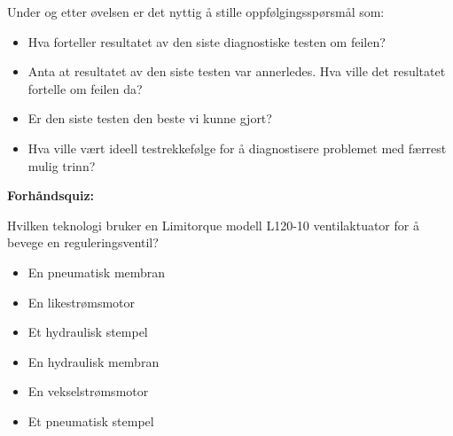 Under og etter øvelsen er det nyttig å stille oppfølgingsspørsmål som:

\begin{itemize}
\item{} Hva forteller resultatet av den siste diagnostiske testen om feilen?
\item{} Anta at resultatet av den siste testen var annerledes. Hva ville det resultatet fortelle om feilen da?
\item{} Er den siste testen den beste vi kunne gjort?
\item{} Hva ville vært ideell testrekkefølge for å diagnostisere problemet med færrest mulig trinn?
\end{itemize}












\vfil \eject

\noindent
{\bf Forhåndsquiz:}

Hvilken teknologi bruker en Limitorque modell L120-10 ventilaktuator for å bevege en reguleringsventil?

\begin{itemize}
\item{} En pneumatisk membran
\vskip 5pt 
\item{} En likestrømsmotor
\vskip 5pt 
\item{} Et hydraulisk stempel
\vskip 5pt 
\item{} En hydraulisk membran
\vskip 5pt 
\item{} En vekselstrømsmotor
\vskip 5pt 
\item{} Et pneumatisk stempel
\end{itemize}




